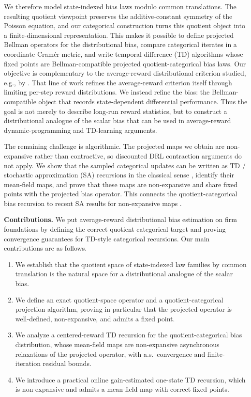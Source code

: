 \documentclass{article}
\begin{document}
We therefore model state-indexed bias laws modulo common translations. The resulting quotient viewpoint preserves the additive-constant symmetry of the Poisson equation, and our categorical construction turns this quotient object into a finite-dimensional representation. This makes it possible to define projected Bellman operators for the distributional bias, compare categorical iterates in a coordinate Cram\'er metric, and write temporal-difference (TD) algorithms whose fixed points are Bellman-compatible projected quotient-categorical bias laws. Our objective is complementary to the average-reward distributional criterion studied, e.g., by \citet{rojas2026differential}. That line of work refines the average-reward criterion itself through limiting per-step reward distributions. We instead refine the bias: the Bellman-compatible object that records state-dependent differential performance. Thus the goal is not merely to describe long-run reward statistics, but to construct a distributional analogue of the scalar bias that can be used in average-reward dynamic-programming and TD-learning arguments.

The remaining challenge is algorithmic. The projected maps we obtain are non-expansive rather than contractive, so discounted DRL contraction arguments do not apply. We show that the sampled categorical updates can be written as TD / stochastic approximation (SA) recursions in the classical sense \citep{robbins1951stochastic, sutton1988learning, tsitsiklis1994asynchronous, borkar1998asynchronous, borkar2008stochastic}, identify their mean-field maps, and prove that these maps are non-expansive and share fixed points with the projected bias operator. This connects the quotient-categorical bias recursion to recent SA results for non-expansive maps \citep{bravo2024stochastic, blaser2026asymptotic}.

\noindent\textbf{Contributions.} We put average-reward distributional bias estimation on firm foundations by defining the correct quotient-categorical target and proving convergence guarantees for TD-style categorical recursions. Our main contributions are as follows.

\begin{enumerate}[leftmargin=*,labelsep=0.2em, align=left, itemsep=2pt]
\item We establish that the quotient space of state-indexed law families by common translation is the natural space for a distributional analogue of the scalar bias.
\item We define an exact quotient-space operator and a quotient-categorical projection algorithm, proving in particular that the projected operator is well-defined, non-expansive, and admits a fixed point.
\item We analyze a centered-reward TD recursion for the quotient-categorical bias distribution, whose mean-field maps are non-expansive asynchronous relaxations of the projected operator, with a.s.\ convergence and finite-iteration residual bounds.
\item We introduce a practical online gain-estimated one-state TD recursion, which is non-expansive and admits a mean-field map with correct fixed points.
\end{enumerate}
\end{document}
